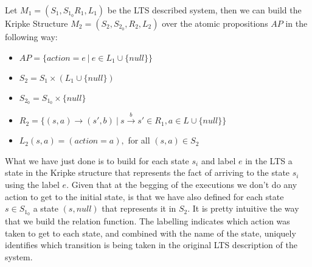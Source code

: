 \documentclass[12pt]{article}
\begin{document}
Let $M_1 = (S_1, S_{1_0} R_1, L_1)$ be the LTS described system, then we can build the Kripke Structure $M_2 = (S_2,S_{2_0},R_2,L_2)$ over the atomic propositions $AP$ in the following way:
\begin{itemize}
\item $ AP = \{action = e ~|~ e \in L_1 \cup \{null\}\} $
\item $ S_2 = S_1 \times (L_1 \cup \{null\}) $
\item $S_{2_0} = S_{1_0} \times \{null\}$
\item $R_2 = \{(s,a) \rightarrow (s',b) ~|~ s\overset{b}{\rightarrow}s' \in R_1, a \in L \cup \{null\}\}$
\item $L_2(s,a) = (action = a),$ for all $(s,a) \in S_2$
\end{itemize}
What we have just done is to build for each state $s_i$ and label $e$ in the LTS a state in the Kripke structure that represents the fact of arriving to the state $s_i$ using the label $e$. Given that at the begging of the executions we don't do any action to get to the initial state, is that we have also defined for each state $s \in S_{1_0}$ a state $(s,null)$ that represents it in $S_2$. It is pretty intuitive the way that we build the relation function. The labelling indicates which action was taken to get to each state, and combined with the name of the state, uniquely identifies which transition is being taken in the original LTS description of the system.
\end{document}
